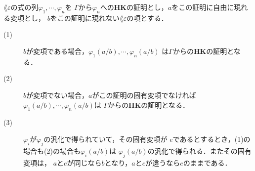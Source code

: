 	\begin{screen}
		\begin{metathm}[証明に現れる変項に代入しても証明]
		\label{metathm:substitute_HK_proof}
			$\lang{\varepsilon}$の式の列$\varphi_{1},\cdots,\varphi_{n}$を
			$\Gamma$から$\varphi_{n}$への{\bf HK}の証明とし，$a$をこの証明に自由に現れる変項とし，
			$b$をこの証明に現れない$\lang{\varepsilon}$の項とする．
			\begin{description}
				\item[(1)] $b$が変項である場合，$\varphi_{1}(a/b),\cdots,\varphi_{n}(a/b)$
					は$\Gamma$からの{\bf HK}の証明となる．
					
				\item[(2)] $b$が変項でない場合\footnotemark，$a$がこの証明の固有変項でなければ
					$\varphi_{1}(a/b),\cdots,\varphi_{n}(a/b)$は
					$\Gamma$からの{\bf HK}の証明となる．
					
				\item[(3)] $\varphi_{i}$が$\varphi_{j}$の汎化で得られていて，その固有変項が
					$e$であるとするとき，(1)の場合も(2)の場合も$\varphi_{i}(a/b)$は
					$\varphi_{j}(a/b)$の汎化で得られる．またその固有変項は，
					$a$と$e$が同じなら$b$となり，$a$と$e$が違うなら$e$のままである．
			\end{description}
		\end{metathm}
	\end{screen}
	
	
